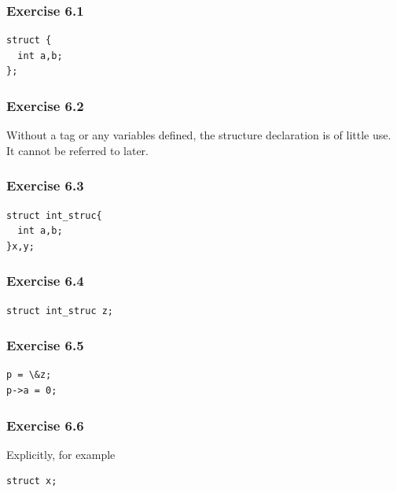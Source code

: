   

  \subsubsection*{Exercise 6.1}

   \begin{Verbatim}
struct {
  int a,b;
};
\end{Verbatim}

  

  \subsubsection*{Exercise 6.2}

   Without a tag or any variables defined, the structure declaration is of
    little use. It cannot be referred to later.


  

  \subsubsection*{Exercise 6.3}

   \begin{Verbatim}
struct int_struc{
  int a,b;
}x,y;
\end{Verbatim}

  

  \subsubsection*{Exercise 6.4}

   \begin{Verbatim}
struct int_struc z;
\end{Verbatim}

  

  \subsubsection*{Exercise 6.5}

   \begin{Verbatim}
p = \&z;
p->a = 0;
\end{Verbatim}

  

  \subsubsection*{Exercise 6.6}

   Explicitly, for example


   \begin{Verbatim}
struct x;
\end{Verbatim}

